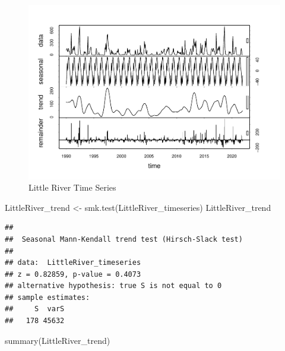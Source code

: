 \documentclass[
  12pt,
]{article}
\newenvironment{Shaded}{\begin{snugshade}}{\end{snugshade}}
\newcommand{\FunctionTok}[1]{\textcolor[rgb]{0.00,0.00,0.00}{#1}}
\newcommand{\NormalTok}[1]{#1}
\newcommand{\OtherTok}[1]{\textcolor[rgb]{0.56,0.35,0.01}{#1}}
\begin{document}
\begin{figure}
\centering
\includegraphics{Project_files/figure-latex/Little River Time Series-1.pdf}
\caption{Little River Time Series}
\end{figure}

\begin{Shaded}
\begin{Highlighting}[]
\NormalTok{LittleRiver\_trend }\OtherTok{\textless{}{-}} \FunctionTok{smk.test}\NormalTok{(LittleRiver\_timeseries)}
\NormalTok{LittleRiver\_trend}
\end{Highlighting}
\end{Shaded}

\begin{verbatim}
## 
##  Seasonal Mann-Kendall trend test (Hirsch-Slack test)
## 
## data:  LittleRiver_timeseries
## z = 0.82859, p-value = 0.4073
## alternative hypothesis: true S is not equal to 0
## sample estimates:
##     S  varS 
##   178 45632
\end{verbatim}

\begin{Shaded}
\begin{Highlighting}[]
\FunctionTok{summary}\NormalTok{(LittleRiver\_trend)}
\end{Highlighting}
\end{Shaded}
\end{document}
